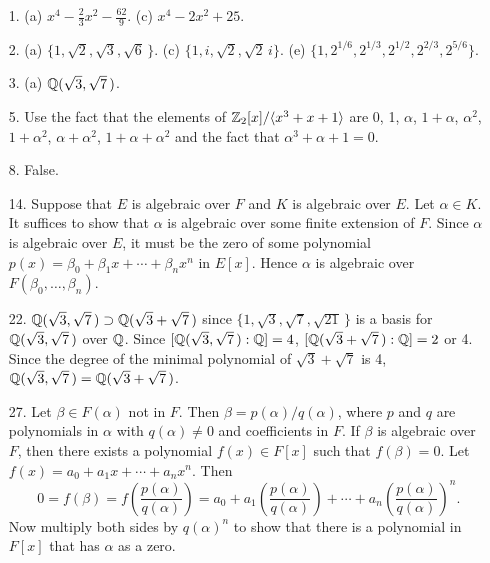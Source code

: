 {\small
\begin{itemize}
 
\item[1.] 
(a) $x^4 -\frac{2}{3} x^2 - \frac{62}{9}$.
(c) $x^4 - 2 x^2 + 25$.
 
\item[2.] 
(a) $\{ 1, \sqrt{2}, \sqrt{3}, \sqrt{6}\, \}$.
(c) $\{ 1, i, \sqrt{2}, \sqrt{2}\, i \}$.
(e) $\{1, 2^{1/6}, 2^{1/3}, 2^{1/2}, 2^{2/3}, 2^{5/6}  \}$.
 
\item[3.]
(a) ${\Bbb Q}(\sqrt{3}, \sqrt{7}\, )$.
 

\item[5.]
Use the fact that the elements of ${\Bbb Z}_2[x]/ \langle x^3 + x +
1\rangle$ are 0, 1, $\alpha$, $1 + \alpha$, $\alpha^2$, $1 + \alpha^2$,
$\alpha + \alpha^2$, $1 + \alpha + \alpha^2$ and the fact that
$\alpha^3 + \alpha + 1 = 0$. 


\item[8.]
False.


\item[14.]
Suppose that $E$ is algebraic over $F$ and $K$ is
algebraic over $E$. Let $\alpha \in K$. It suffices to show that
$\alpha$ is algebraic over some finite extension of $F$. Since
$\alpha$ is algebraic over $E$, it must be the zero of some polynomial
$p(x) = \beta_0 + \beta_1 x + \cdots + \beta_n x^n$ in $E[x]$. Hence
$\alpha$ is algebraic over $F(\beta_0, \ldots, \beta_n)$.


\item[22.]
${\Bbb Q}( \sqrt{3}, \sqrt{7}\, ) \supset {\Bbb Q}( \sqrt{3} +\sqrt{7}\,
)$ since $\{ 1, \sqrt{3}, \sqrt{7}, \sqrt{21}\, \}$ is a basis for
${\Bbb Q}( \sqrt{3}, \sqrt{7}\, )$ over ${\Bbb Q}$. Since $[{\Bbb Q}(
\sqrt{3}, \sqrt{7}\, ) : {\Bbb Q}] = 4$, $[{\Bbb Q}( \sqrt{3}
+\sqrt{7}\, ) : {\Bbb Q}] = 2$ or 4. Since the degree of the minimal
polynomial of $\sqrt{3} +\sqrt{7}$ is 4, ${\Bbb Q}( \sqrt{3},
\sqrt{7}\, ) = {\Bbb Q}( \sqrt{3} +\sqrt{7}\, )$.


\item[27.]
Let $\beta \in F(\alpha)$ not in $F$. Then $\beta =
p(\alpha)/q(\alpha)$, where $p$ and $q$ are polynomials in $\alpha$
with $q(\alpha) \neq 0$ and coefficients in $F$. If $\beta$ is
algebraic over $F$, then there exists a polynomial $f(x) \in F[x]$
such that $f(\beta) = 0$. Let $f(x) = a_0 + a_1 x + \cdots + a_n x^n$.
Then  
\[
0 = f(\beta) = f\left( 
\frac{p(\alpha)}{q(\alpha)} \right)
= a_0 + a_1 \left( \frac{p(\alpha)}{q(\alpha)} \right)  + \cdots + a_n
\left( \frac{p(\alpha)}{q(\alpha)} \right)^n. 
\]
Now multiply both sides by $q(\alpha)^n$ to show that there is a
polynomial in $F[x]$ that has $\alpha$ as a zero.




\end{itemize}
}
 
